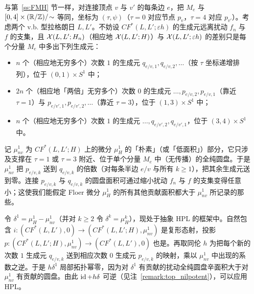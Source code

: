 与第~\ref{ss:FMH} 节一样，对连接顶点 $v$ 与 $v'$ 的每条边 $e$，把 $M_e$ 与 $[0,4]\times(\mathbb{R}/\mathbb{Z})/\!\sim$ 等同，坐标为 $(\tau,\psi)$（$\tau=0$ 对应节点 $p_v$，$\tau=4$ 对应 $p_{v'}$）。考虑两个 v.b. 型拉格朗日 $L,L'$。不妨设 $CF^*(L,L';\varepsilon h)$ 的生成元远离扰动 $f_n$ 与 $f$ 的支集，且 $\mathcal{X}(L,L';H_n)$（相应地 $\mathcal{X}(L,L';H)$）与 $\mathcal{X}(L,L';\varepsilon h)$ 的差别只是每个分量 $M_e$ 中多出下列生成元：
\begin{itemize}
\item $n$ 个（相应地无穷多个）次数 $1$ 的生成元 $q_{e/v,1},q_{e/v,2},\dots$（按 $\tau$ 坐标递增排列），位于 $(0,1)\times S^1$ 中；
\item $2n$ 个（相应地「两倍」无穷多个）次数 $0$ 的生成元 $\dots,p_{e/v,2},p_{e/v,1}$（靠近 $\tau=1$）与 $p_{e/v',1},p_{e/v',2},\dots$（靠近 $\tau=3$），位于 $(1,3)\times S^1$ 中；
\item $n$ 个（相应地无穷多个）次数 $1$ 的生成元 $\dots,q_{e/v',2},q_{e/v',1}$，位于 $(3,4)\times S^1$ 中。
\end{itemize}

记 $\mu^1_{nv}$ 为 $CF^*(L,L';H)$ 上的微分 $\mu^1_H$ 的「朴素」（或「低面积」）部分，它只涉及支撑在 $\tau=1$ 或 $\tau=3$ 附近、位于单个分量 $M_e$ 中（无传播）的全纯圆盘。于是 $\mu^1_{nv}$ 把 $p_{e/v,k}$ 送到 $q_{e/v,k}$ 的倍数（对每条半边 $e/v$ 与所有 $k\geq 1$），把其余生成元送到零。连接 $p_{e/v,k}$ 与 $q_{e/v,k}$ 的圆盘面积可通过缩小扰动 $f_n$ 与 $f$ 的支集变得任意小；这使我们能假定 Floer 微分 $\mu^1_H$ 的所有其他贡献面积都大于 $\mu^1_{nv}$ 所记录的那些。

令 $\delta^1=\mu^1_H-\mu^1_{nv}$（并对 $k\geq 2$ 令 $\delta^k=\mu^k_H$），现处于抽象 HPL 的框架中。自然包含 $i:(CF^*(L,L'),0)\to (CF^*(L,L';H),\mu^1_{nv})$ 是复形态射，投影 $p:(CF^*(L,L';H),\mu^1_{nv})\to (CF^*(L,L'),0)$ 也是。再取同伦 $h$ 为把每个新的次数 $1$ 生成元 $q_{e/v,k}$ 送到相应次数 $0$ 生成元 $p_{e/v,k}$ 的映射，乘以 $\mu^1_{nv}$ 中出现的系数之逆。于是 $h\delta^1$ 局部拓扑幂零，因为对 $\delta^1$ 有贡献的扰动全纯圆盘辛面积大于对 $\mu^1_{nv}$ 有贡献的圆盘。由此 $\operatorname{id}+h\delta$ 可逆（见注~\ref{remark:top_nilpotent}），可以应用 HPL。


